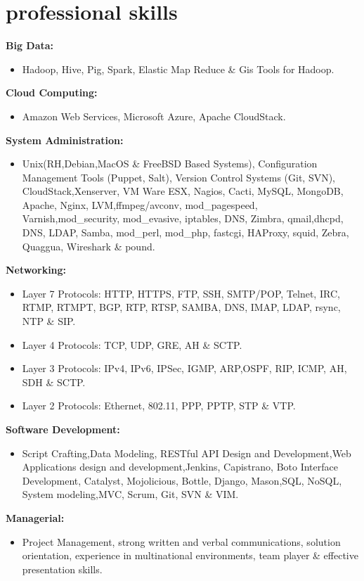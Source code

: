 \documentclass[]{friggeri-cv} %
\begin{document}
\section{professional skills}
{\large \textbf{Big Data:}}
\begin{itemize}
\item Hadoop, Hive, Pig, Spark, Elastic Map Reduce \& Gis Tools for Hadoop.   
\end{itemize}
{\large \textbf{Cloud Computing:}}
\begin{itemize}
\item Amazon Web Services, Microsoft Azure, Apache CloudStack.   
\end{itemize}
{\large \textbf{System Administration:}}
\begin{itemize}
\item Unix(RH,Debian,MacOS \& FreeBSD Based Systems), Configuration Management Tools (Puppet, Salt), Version Control Systems (Git, SVN), CloudStack,Xenserver, VM Ware ESX, Nagios, Cacti, MySQL, MongoDB, Apache, Nginx, LVM,ffmpeg/avconv, mod\_pagespeed, \\ 
Varnish,mod\_security, mod\_evasive, iptables, DNS, Zimbra, qmail,dhcpd, DNS, LDAP, Samba, mod\_perl, mod\_php, fastcgi, HAProxy, squid, Zebra, Quaggua, Wireshark \& pound.  
\end{itemize}
{\large \textbf{Networking:}}
\begin{itemize}
\item Layer 7 Protocols: HTTP, HTTPS, FTP, SSH, SMTP/POP, Telnet, IRC, RTMP, RTMPT, BGP, RTP, RTSP, SAMBA, DNS, IMAP, LDAP, rsync, NTP \& SIP. 
\item Layer 4 Protocols: TCP, UDP, GRE, AH \& SCTP.
\item Layer 3 Protocols: IPv4, IPv6, IPSec, IGMP, ARP,OSPF, RIP, ICMP, AH, SDH \& SCTP.
\item Layer 2 Protocols: Ethernet, 802.11, PPP, PPTP, STP \& VTP.
\end{itemize}
{\large \textbf{Software Development:}}
\begin{itemize}
\item Script Crafting,Data Modeling, RESTful API Design and Development,Web Applications design and development,Jenkins, Capistrano, Boto Interface Development, Catalyst, Mojolicious, Bottle, Django, Mason,SQL, NoSQL, System modeling,MVC, Scrum, Git, SVN \& VIM.
\end{itemize}
{\large \textbf{Managerial:}}
\begin{itemize}
\item Project Management, strong written and verbal communications, solution orientation, experience in multinational environments, team player  \& effective presentation skills. 
\end{itemize}
\end{document}
